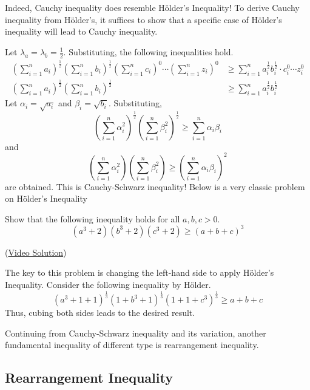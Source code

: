 \documentclass[../../main.tex]{subfiles}
\begin{document}
Indeed, Cauchy inequality does resemble Hölder's Inequality!
To derive Cauchy inequality from Hölder's, it suffices to show
that a specific case of Hölder's inequality will lead to
Cauchy inequality.

Let $\lambda_a = \lambda_b = \frac{1}{2}$. Substituting,
the following inequalities hold.
\begin{align*}
    \left( \sum_{i=1}^n a_i \right)^\frac{1}{2}
    \left( \sum_{i=1}^n b_i \right)^\frac{1}{2}
    \left( \sum_{i=1}^n c_i \right)^0 \cdots
    \left( \sum_{i=1}^n z_i \right)^0
    &\geq
    \sum_{i=1}^n
        a_i^{\frac{1}{2}} b_i^{\frac{1}{2}} \cdot
        c_i^0 \cdots z_i^0 \\
    \left( \sum_{i=1}^n a_i \right)^\frac{1}{2}
    \left( \sum_{i=1}^n b_i \right)^\frac{1}{2}
    &\geq
    \sum_{i=1}^n a_i^\frac{1}{2} b_i^\frac{1}{2}
\end{align*}
Let $\alpha_i = \sqrt{a_i}$ and $\beta_i = \sqrt{b_i}$. Substituting,
\[
\left( \sum_{i=1}^n \alpha_i^2 \right)^\frac{1}{2}
\left( \sum_{i=1}^n \beta_i^2 \right)^\frac{1}{2}
\geq
\sum_{i=1}^n \alpha_i \beta_i
\]
and
\[
\left( \sum_{i=1}^n \alpha_i^2 \right)
\left( \sum_{i=1}^n \beta_i^2 \right)
\geq
\left( \sum_{i=1}^n \alpha_i \beta_i \right)^2
\]
are obtained. This is Cauchy-Schwarz inequality! Below is a very
classic problem on Hölder's Inequality

\begin{problem}{}{}
Show that the following inequality holds for all $a, b, c > 0$.
\[
(a^3 + 2)(b^3 + 2)(c^3 + 2) \geq (a + b + c)^3
\]
\end{problem}

(\href{https://youtu.be/FUtgo54gq7I}{Video Solution})

\begin{solution}
The key to this problem is changing the left-hand side to apply
Hölder's Inequality. Consider the following inequality by Hölder.
\[
(a^3 + 1 + 1)^\frac{1}{3} (1 + b^3 + 1)^\frac{1}{3}
    (1 + 1 + c^3)^\frac{1}{3}
\geq a + b + c
\]
Thus, cubing both sides leads to the desired result.
\end{solution}

Continuing from Cauchy-Schwarz inequality and its variation, another
fundamental inequality of different type is rearrangement inequality.

\subsection{Rearrangement Inequality}
\end{document}
